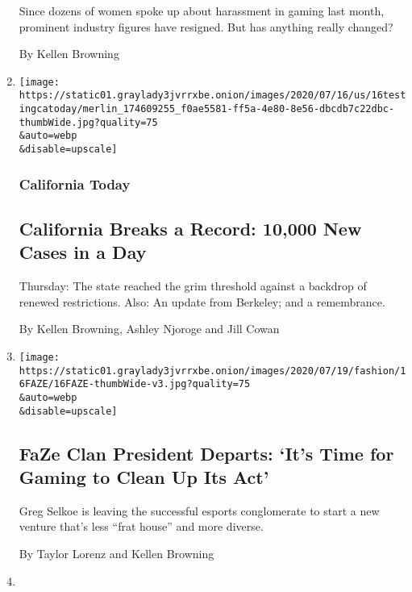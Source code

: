 \begin{enumerate}
  Since dozens of women spoke up about harassment in gaming last month,
  prominent industry figures have resigned. But has anything really
  changed?

  By Kellen Browning
\item
  \href{/2020/07/16/us/california-coronavirus-cases.html}{}

  \texttt{[image: https://static01.graylady3jvrrxbe.onion/images/2020/07/16/us/16testingcatoday/merlin\_174609255\_f0ae5581-ff5a-4e80-8e56-dbcdb7c22dbc-thumbWide.jpg?quality=75\\\&auto=webp\\\&disable=upscale]}

  \hypertarget{california-today}{%
  \subsubsection{California Today}\label{california-today}}

  \hypertarget{california-breaks-a-record-10000-new-cases-in-a-day}{%
  \subsection{California Breaks a Record: 10,000 New Cases in a
  Day}\label{california-breaks-a-record-10000-new-cases-in-a-day}}

  Thursday: The state reached the grim threshold against a backdrop of
  renewed restrictions. Also: An update from Berkeley; and a
  remembrance.

  By Kellen Browning, Ashley Njoroge and Jill Cowan
\item
  \href{/2020/07/16/style/xset-gaming-lifestyle-company-faze-clan.html}{}

  \texttt{[image: https://static01.graylady3jvrrxbe.onion/images/2020/07/19/fashion/16FAZE/16FAZE-thumbWide-v3.jpg?quality=75\\\&auto=webp\\\&disable=upscale]}

  \hypertarget{faze-clan-president-departs-its-time-for-gaming-to-clean-up-its-act}{%
  \subsection{FaZe Clan President Departs: `It's Time for Gaming to
  Clean Up Its
  Act'}\label{faze-clan-president-departs-its-time-for-gaming-to-clean-up-its-act}}

  Greg Selkoe is leaving the successful esports conglomerate to start a
  new venture that's less ``frat house'' and more diverse.

  By Taylor Lorenz and Kellen Browning
\item
  \href{/live/2020/07/09/business/stock-market-today-coronavirus/personal-computer-market-rebounds-in-second-quarter}{}


\end{enumerate}
